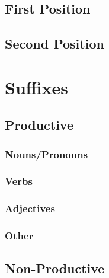 \subsection{First Position}






\subsection{Second Position}




\section{Suffixes}

\subsection{Productive}

\subsubsection{Nouns/Pronouns}

\subsubsection{Verbs}

\subsubsection{Adjectives}

\subsubsection{Other}

\subsection{Non-Productive}